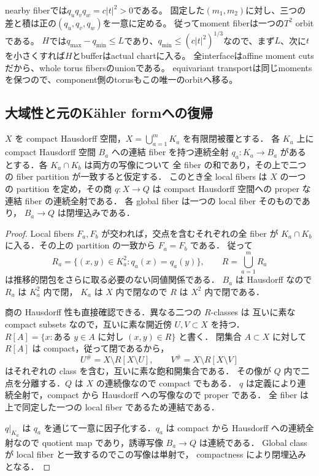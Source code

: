 nearby fiberでは$q_uq_vq_w=c|t|^2>0$である。
固定した$(m_1,m_2)$に対し、三つの差と積は正の$(q_u,q_v,q_w)$を一意に定める。
従ってmoment fiberは一つの$T^2$ orbitである。
$H$では$q_{\max}-q_{\min}\le L$であり、$q_{\min}\le(c|t|^2)^{1/3}$なので、まず$L$、次に$t$を小さくすれば$H$とbufferはactual chartに入る。
全interfaceはaffine moment cutsだから、whole torus fibersのunionである。
equivariant transportは同じmomentsを保つので、component側のtorusもこの唯一のorbitへ移る。

\subsection{大域性と元のKähler formへの復帰}

\begin{lemma}[全ファイバーを保つ有限閉被覆の商]
\label{glue:closed-whole-fiber-quotient}
$X$ を compact Hausdorff 空間，$X=\bigcup_{a=1}^mK_a$ を有限閉被覆とする．
各 $K_a$ 上に compact Hausdorff 空間 $B_a$ への連結 fiber を持つ連続全射
$q_a:K_a\to B_a$ があるとする．各 $K_a\cap K_b$ は両方の写像について
全 fiber の和であり，その上で二つの fiber partition が一致すると仮定する．
このとき全 local fibers は $X$ の一つの partition を定め，その商
$q:X\to Q$ は compact Hausdorff 空間への proper な連結 fiber の連続全射である．
各 global fiber は一つの local fiber そのものであり，
$B_a\to Q$ は閉埋込みである．
\end{lemma}
\begin{proof}
Local fibers $F_a,F_b$ が交われば，交点を含むそれぞれの全 fiber が
$K_a\cap K_b$ に入る．その上の partition の一致から $F_a=F_b$ である．
従って
\[
 R_a=\{(x,y)\in K_a^2:q_a(x)=q_a(y)\},\qquad
 R=\bigcup_{a=1}^mR_a
\]
は推移的閉包をさらに取る必要のない同値関係である．
$B_a$ は Hausdorff なので $R_a$ は $K_a^2$ 内で閉，
$K_a$ は $X$ 内で閉なので $R$ は $X^2$ 内で閉である．

商の Hausdorff 性も直接確認できる．異なる二つの $R$-classes は
互いに素な compact subsets なので，互いに素な開近傍 $U,V\subset X$ を持つ．
$R[A]=\{x:\text{ある }y\in A\text{ に対し }(x,y)\in R\}$ と書く．
閉集合 $A\subset X$ に対して $R[A]$ は compact，従って閉であるから，
\[
 U^\#=X\setminus R[X\setminus U],\qquad
 V^\#=X\setminus R[X\setminus V]
\]
はそれぞれの class を含む，互いに素な飽和開集合である．
その像が $Q$ 内で二点を分離する．$Q$ は $X$ の連続像なので compact でもある．
$q$ は定義により連続全射で，compact から Hausdorff への写像なので proper である．
全 fiber は上で同定した一つの local fiber であるため連結である．

$q|_{K_a}$ は $q_a$ を通じて一意に因子化する．$q_a$ は compact から
Hausdorff への連続全射なので quotient map であり，誘導写像 $B_a\to Q$ は連続である．
Global class が local fiber と一致するのでこの写像は単射で，
compactness により閉埋込みとなる．
\end{proof}

